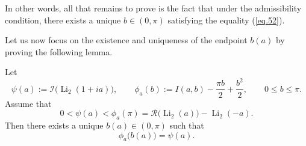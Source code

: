 \documentclass[preprint,12pt,nopreprintline]{elsarticle}
\begin{document}
In other words, all that remains to prove is the fact that under the admissibility condition, there exists a
unique \(b\in(0,\pi)\) satisfying the equality (\ref{eq.52}).

Let us now focus on the existence and uniqueness of the endpoint \(b(a)\) by proving the following lemma. 

\begin{lemma}\label{lem.2}
Let
\begin{equation}
\psi(a):=\mathscr{I}\!\bigl(\operatorname{Li}_2(1+ia)\bigr),
\qquad
\phi_a(b):=I(a,b)-\frac{\pi b}{2}+\frac{b^2}{2},
\qquad 0\le b\le \pi.
\end{equation}
Assume that
\begin{equation}
0<\psi(a)<\phi_a(\pi)
=
\mathscr{R}\!\bigl(\operatorname{Li}_2(a)\bigr)-\operatorname{Li}_2(-a).
\end{equation}
Then there exists a unique \(b(a)\in(0,\pi)\) such that
\begin{equation}
\phi_a\bigl(b(a)\bigr)=\psi(a).
\end{equation}
\end{lemma}
\end{document}

